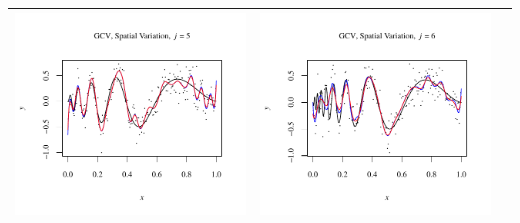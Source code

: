 \documentclass[11pt]{article}
\begin{document}
\begin{table}[h!]
\begin{center}
\begin{tabular}{| >{\centering\arraybackslash}m{2.1in} |  >{\centering\arraybackslash}m{2.1in} |  >{\centering\arraybackslash}m{2.1in}|}
      \includegraphics[width=1\linewidth,height=0.18\textheight]{Graphs/2/3/assignment5_a_2_3_5}&
      \includegraphics[width=1\linewidth,height=0.18\textheight]{Graphs/2/3/assignment5_a_2_3_6}\\\hline
    \end{tabular}
  \end{center}
\end{table}
\end{document}

